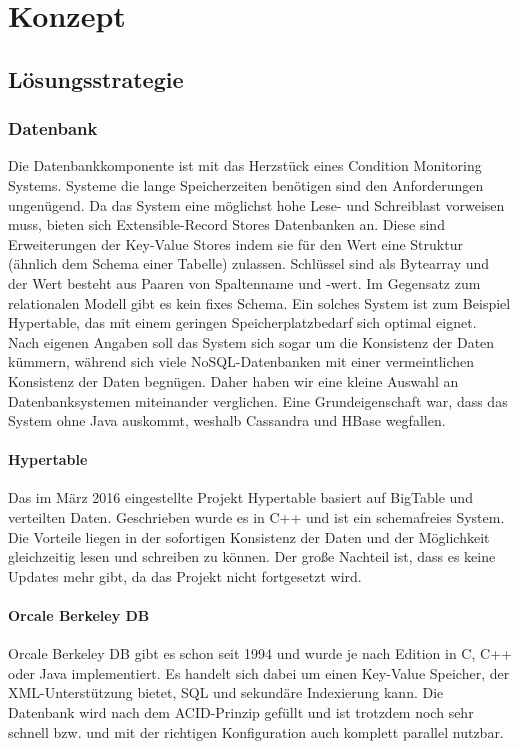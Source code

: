 \chapter{Konzept}
\label{ch:Konzept}
\section{Lösungsstrategie}
\subsection{Datenbank}
Die Datenbankkomponente ist mit das Herzstück eines Condition Monitoring Systems. Systeme die lange Speicherzeiten benötigen sind den Anforderungen ungenügend. Da das System eine möglichst hohe Lese- und Schreiblast vorweisen muss, bieten sich Extensible-Record Stores Datenbanken an. Diese sind Erweiterungen der Key-Value Stores indem sie für den Wert eine Struktur (ähnlich dem Schema einer Tabelle) zulassen. Schlüssel sind als Bytearray und der Wert besteht aus Paaren von Spaltenname und -wert. Im Gegensatz zum relationalen Modell gibt es kein fixes Schema. Ein solches System ist zum Beispiel Hypertable, das mit einem geringen Speicherplatzbedarf sich optimal eignet. Nach eigenen Angaben soll das System sich sogar um die Konsistenz der Daten kümmern, während sich viele NoSQL-Datenbanken mit einer vermeintlichen Konsistenz der Daten begnügen. Daher haben wir eine kleine Auswahl an Datenbanksystemen miteinander verglichen. Eine Grundeigenschaft war, dass das System ohne Java auskommt, weshalb Cassandra und HBase wegfallen.
\subsubsection{Hypertable}
Das im März 2016 eingestellte Projekt Hypertable basiert auf BigTable und verteilten Daten. Geschrieben wurde es in C++ und ist ein schemafreies System. Die Vorteile liegen in der sofortigen Konsistenz der Daten und der Möglichkeit gleichzeitig lesen und schreiben zu können. Der große Nachteil ist, dass es keine Updates mehr gibt, da das Projekt nicht fortgesetzt wird.
\subsubsection{Orcale Berkeley DB}
Orcale Berkeley DB gibt es schon seit 1994 und wurde je nach Edition in C, C++ oder Java implementiert. Es handelt sich dabei um einen Key-Value Speicher, der XML-Unterstützung bietet, SQL und sekundäre Indexierung kann. Die Datenbank wird nach dem ACID-Prinzip gefüllt und ist trotzdem noch sehr schnell bzw. und mit der richtigen Konfiguration auch komplett parallel nutzbar.
